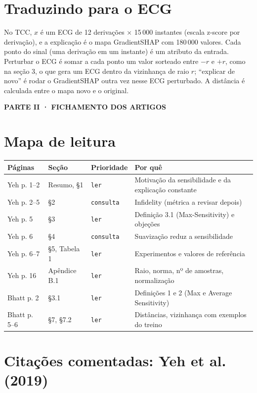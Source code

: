 \documentclass[11pt,a4paper]{article}
\newcommand{\readtag}[1]{\texttt{\small #1}}
\newcommand{\partbar}[1]{\par\vspace{1.2em}\noindent\colorbox{black!80}{\parbox{\dimexpr\linewidth-2\fboxsep}{\color{white}\bfseries\sffamily\MakeUppercase{#1}}}\par\vspace{0.4em}}
\begin{document}
\section{Traduzindo para o ECG}
No TCC, $x$ é um ECG de 12 derivações × 15\,000 instantes (escala z-score por derivação), e a explicação é o mapa GradientSHAP com 180\,000 valores. Cada ponto do sinal (uma derivação em um instante) é um atributo da entrada. Perturbar o ECG é somar a cada ponto um valor sorteado entre $-r$ e $+r$, como na seção 3, o que gera um ECG dentro da vizinhança de raio $r$; “explicar de novo” é rodar o GradientSHAP outra vez nesse ECG perturbado. A distância é calculada entre o mapa novo e o original.

\partbar{Parte II · Fichamento dos artigos}

\section{Mapa de leitura}
\begin{center}\small
\begin{tabularx}{\linewidth}{llll}
\toprule
\textbf{Páginas} & \textbf{Seção} & \textbf{Prioridade} & \textbf{Por quê} \\
\midrule
Yeh p. 1--2 & Resumo, §1 & \readtag{ler} & Motivação da sensibilidade e da explicação constante \\
Yeh p. 2--5 & §2 & \readtag{consulta} & Infidelity (métrica a revisar depois) \\
Yeh p. 5 & §3 & \readtag{ler} & Definição 3.1 (Max-Sensitivity) e objeções \\
Yeh p. 6 & §4 & \readtag{consulta} & Suavização reduz a sensibilidade \\
Yeh p. 6--7 & §5, Tabela 1 & \readtag{ler} & Experimentos e valores de referência \\
Yeh p. 16 & Apêndice B.1 & \readtag{ler} & Raio, norma, nº de amostras, normalização \\
Bhatt p. 2 & §3.1 & \readtag{ler} & Definições 1 e 2 (Max e Average Sensitivity) \\
Bhatt p. 5--6 & §7, §7.2 & \readtag{ler} & Distâncias, vizinhança com exemplos do treino \\
\bottomrule
\end{tabularx}
\end{center}

\section{Citações comentadas: Yeh et al. (2019)}
\end{document}
